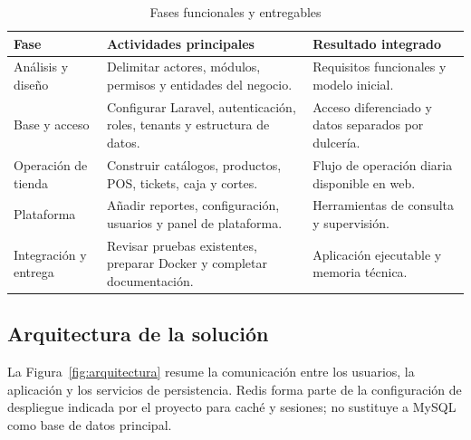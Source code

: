 \begin{table}[htbp]
\centering
\caption{Fases funcionales y entregables}
\label{tab:fases}
\begin{tabularx}{\textwidth}{|>{\raggedright\arraybackslash}p{2.6cm}|X|>{\raggedright\arraybackslash}p{4.0cm}|}
\hline
\textbf{Fase} & \textbf{Actividades principales} & \textbf{Resultado integrado} \\
\hline
Análisis y diseño & Delimitar actores, módulos, permisos y entidades del negocio. & Requisitos funcionales y modelo inicial. \\
\hline
Base y acceso & Configurar Laravel, autenticación, roles, tenants y estructura de datos. & Acceso diferenciado y datos separados por dulcería. \\
\hline
Operación de tienda & Construir catálogos, productos, POS, tickets, caja y cortes. & Flujo de operación diaria disponible en web. \\
\hline
Plataforma & Añadir reportes, configuración, usuarios y panel de plataforma. & Herramientas de consulta y supervisión. \\
\hline
Integración y entrega & Revisar pruebas existentes, preparar Docker y completar documentación. & Aplicación ejecutable y memoria técnica. \\
\hline
\end{tabularx}
\end{table}

\subsection{Arquitectura de la solución}
La Figura~\ref{fig:arquitectura} resume la comunicación entre los usuarios, la aplicación y los servicios de persistencia. Redis forma parte de la configuración de despliegue indicada por el proyecto para caché y sesiones; no sustituye a MySQL como base de datos principal.

